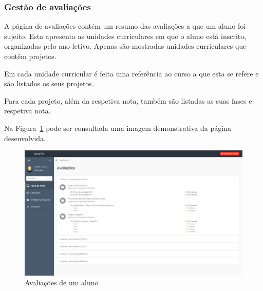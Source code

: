 \subsubsection{Gestão de avaliações}

A página de avaliações contém um resumo das avaliações a que um aluno foi sujeito. Esta apresenta as unidades curriculares em que o aluno está inscrito, organizadas pelo ano letivo. Apenas são mostradas unidades curriculares que contêm projetos.

Em cada unidade curricular é feita uma referência ao curso a que esta se refere e são listados os seus projetos.

Para cada projeto, além da respetiva nota, também são listadas as suas fases e respetiva nota.

Na Figura~\ref{fig:student_grades} pode ser consultada uma imagem demonstrativa da página desenvolvida.

\begin{figure}[H]
  \centering
  \includegraphics[width=1\textwidth,center]{images/implementacao/alunos/grades}
  \caption{Avaliações de um aluno}
  \label{fig:student_grades}
\end{figure}
